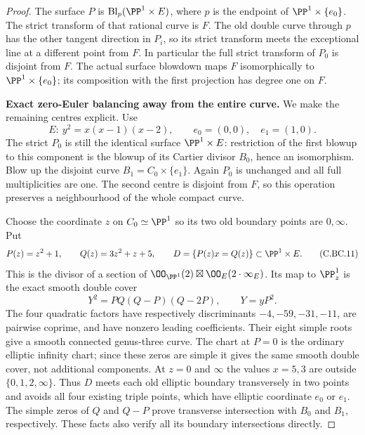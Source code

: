 \begin{proof}
The surface \(P\) is \(\operatorname{Bl}_p(\PP^1\times E)\),
where \(p\) is the endpoint of
\(\PP^1\times\{e_0\}\). The strict transform of that
rational curve is \(F\). The old double curve through
\(p\) has the other tangent direction in \(P_i\), so
its strict transform meets the exceptional line at a
different point from \(F\). In particular the full
strict transform of \(P_0\) is disjoint from \(F\).
The actual surface blowdown maps \(F\) isomorphically
to \(\PP^1\times\{e_0\}\); its composition with
the first projection has degree one on \(F\).

\par\medskip\noindent\textbf{Exact zero-Euler balancing away from the entire curve.}
We make the remaining centres explicit. Use
\[
 E:\ y^2=x(x-1)(x-2),\qquad e_0=(0,0),\quad e_1=(1,0).
                                                               \tag{C.BC.10}\label{cdp:eq:C.BC.10}
\]
The strict \(P_0\) is still the identical surface
\(\PP^1\times E\): restriction of the first blowup
to this component is the blowup of its Cartier divisor
\(B_0\), hence an isomorphism. Blow up the disjoint
curve \(B_1=C_0\times\{e_1\}\). Again \(P_0\)
is unchanged and all full multiplicities are one.
The second centre is disjoint from \(F\), so this
operation preserves a neighbourhood of the whole
compact curve.

Choose the coordinate \(z\) on \(C_0\simeq\PP^1\)
so its two old boundary points are \(0,\infty\). Put
\[
 P(z)=z^2+1,\qquad Q(z)=3z^2+z+5,\qquad
 D=\{P(z)x=Q(z)\}\subset\PP^1\times E .
                                                               \tag{C.BC.11}\label{cdp:eq:C.BC.11}
\]
This is the divisor of a section of
\(\OO_{\PP^1}(2)\boxtimes\OO_E(2\cdot\infty_E)\).
Its map to \(\PP^1_z\) is the exact smooth double
cover
\[
          Y^2=P Q(Q-P)(Q-2P),\qquad Y=yP^2 .                  \tag{C.BC.12}\label{cdp:eq:C.BC.12}
\]
The four quadratic factors have respectively discriminants
\(-4,-59,-31,-11\), are pairwise coprime, and have
nonzero leading coefficients. Their eight simple roots
give a smooth connected genus-three curve. The chart
at \(P=0\) is the ordinary elliptic infinity chart;
since these zeros are simple it gives the same smooth
double cover, not additional components. At \(z=0\)
and \(\infty\) the values \(x=5,3\) are outside
\(\{0,1,2,\infty\}\). Thus \(D\) meets each old
elliptic boundary transversely in two points and avoids
all four existing triple points, which have elliptic
coordinate \(e_0\) or \(e_1\). The simple zeros of
\(Q\) and \(Q-P\) prove transverse intersection
with \(B_0\) and \(B_1\), respectively. These facts
also verify all its boundary intersections directly.


\end{proof}
